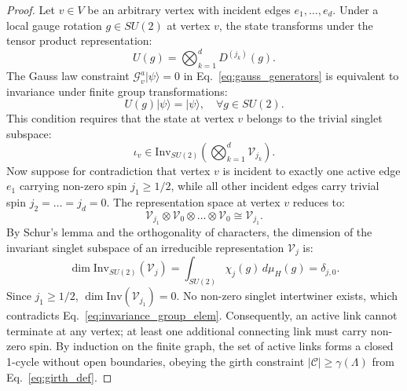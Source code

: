 \documentclass[11pt,reqno]{article}
\begin{document}
\begin{proof}
Let $v \in V$ be an arbitrary vertex with incident edges $e_1, \dots, e_d$.
Under a local gauge rotation $g \in SU(2)$ at vertex $v$, the state transforms under the tensor product representation:
\begin{equation}
    \label{eq:tensor_rep_vertex}
    U(g) = \bigotimes_{k=1}^d D^{(j_k)}(g).
\end{equation}
The Gauss law constraint $\mathcal{G}_v^a |\psi\rangle = 0$ in Eq.~\eqref{eq:gauss_generators} is equivalent to invariance under finite group transformations:
\begin{equation}
    \label{eq:invariance_group_elem}
    U(g) |\psi\rangle = |\psi\rangle, \quad \forall g \in SU(2).
\end{equation}
This condition requires that the state at vertex $v$ belongs to the trivial singlet subspace:
\begin{equation}
    \label{eq:singlet_subspace}
    \iota_v \in \mathrm{Inv}_{SU(2)}\left( \bigotimes_{k=1}^d \mathcal{V}_{j_k} \right).
\end{equation}
Now suppose for contradiction that vertex $v$ is incident to exactly one active edge $e_1$ carrying non-zero spin $j_1 \ge 1/2$, while all other incident edges carry trivial spin $j_2 = \dots = j_d = 0$.
The representation space at vertex $v$ reduces to:
\begin{equation}
    \label{eq:trivial_tensor_prod}
    \mathcal{V}_{j_1} \otimes \mathcal{V}_0 \otimes \dots \otimes \mathcal{V}_0 \cong \mathcal{V}_{j_1}.
\end{equation}
By Schur's lemma and the orthogonality of characters, the dimension of the invariant singlet subspace of an irreducible representation $\mathcal{V}_j$ is:
\begin{equation}
    \label{eq:schur_orthogonality}
    \dim \mathrm{Inv}_{SU(2)}(\mathcal{V}_j) = \int_{SU(2)} \chi_j(g) \, d\mu_H(g) = \delta_{j, 0}.
\end{equation}
Since $j_1 \ge 1/2$, $\dim \mathrm{Inv}(\mathcal{V}_{j_1}) = 0$.
No non-zero singlet intertwiner exists, which contradicts Eq.~\eqref{eq:invariance_group_elem}.
Consequently, an active link cannot terminate at any vertex; at least one additional connecting link must carry non-zero spin.
By induction on the finite graph, the set of active links forms a closed 1-cycle without open boundaries, obeying the girth constraint $|\mathcal{C}| \ge \gamma(\Lambda)$ from Eq.~\eqref{eq:girth_def}.
\end{proof}
\end{document}
